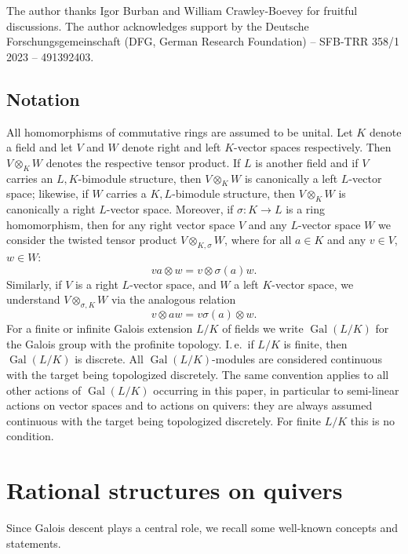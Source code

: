 \documentclass[a4paper,12pt,reqno]{amsart}
\DeclareMathOperator{\Gal}{\mathrm {Gal}}
\theoremstyle{plain}
\theoremstyle{remark}
\begin{document}
\medskip    
The author thanks Igor Burban and William Crawley-Boevey for fruitful discussions. The author acknowledges support by the Deutsche Forschungsgemeinschaft (DFG, German Research Foundation) -- SFB-TRR 358/1 2023 -- 491392403.



\subsection*{Notation}

All homomorphisms of commutative rings are assumed to be unital. Let $K$ denote a field and let $V$ and $W$ denote right and left $K$-vector spaces respectively. Then $V\otimes_K W$ denotes the respective tensor product. If $L$ is another field and if $V$ carries an $L,K$-bimodule structure, then $V\otimes_KW$ is canonically a left $L$-vector space; likewise, if $W$ carries a $K,L$-bimodule structure, then $V\otimes_KW$ is canonically a right $L$-vector space. Moreover, if $\sigma\colon K\to L$ is a ring homomorphism, then for any right vector space $V$ and any $L$-vector space $W$ we consider the twisted tensor product $V\otimes_{K,\sigma}W$, where for all $a\in K$ and any $v\in V$, $w\in W$:
\[
va\otimes w=v\otimes\sigma(a)w.
\]
Similarly, if $V$ is a right $L$-vector space, and $W$ a left $K$-vector space, we understand $V\otimes_{\sigma,K}W$ via the analogous relation
\[
v\otimes aw=v\sigma(a)\otimes w.
\]
For a finite or infinite Galois extension $L/K$ of fields we write $\Gal(L/K)$ for the Galois group with the profinite topology. I.\,e.\ if $L/K$ is finite, then $\Gal(L/K)$ is discrete. All $\Gal(L/K)$-modules are considered continuous with the target being topologized discretely. The same convention applies to all other actions of $\Gal(L/K)$ occurring in this paper, in particular to semi-linear actions on vector spaces and to actions on quivers: they are always assumed continuous with the target being topologized discretely. For finite $L/K$ this is no condition.

\section{Rational structures on quivers}\label{sec:rationalstructures}

Since Galois descent plays a central role, we recall some well-known concepts and statements.
\end{document}
